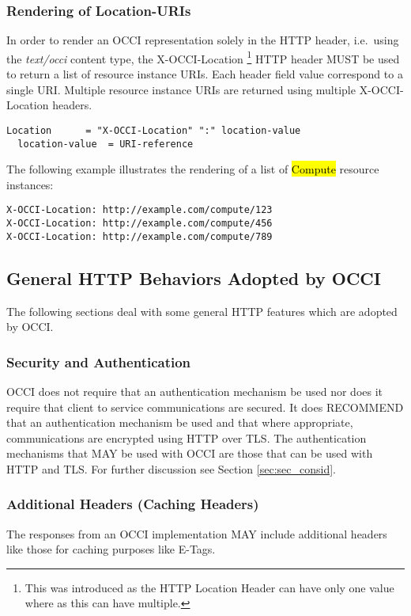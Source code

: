 \documentclass[10pt,a4paper]{article}
\begin{document}
\subsubsection{Rendering of Location-URIs}
In order to render an OCCI representation solely in the HTTP header,
i.e.~using the \textit{text/occi} content type, the X-OCCI-Location 
\footnote{This was introduced as the HTTP Location Header can have
  only one value where as this can have multiple.}  HTTP header MUST
be used to return a list of resource instance URIs. Each header field
value correspond to a single URI. Multiple resource instance URIs are
returned using multiple X-OCCI-Location headers.

\begin{verbatim}
Location      = "X-OCCI-Location" ":" location-value
  location-value  = URI-reference
\end{verbatim}

The following example illustrates the rendering of a list of
\hl{Compute} resource instances:
\begin{verbatim}
X-OCCI-Location: http://example.com/compute/123
X-OCCI-Location: http://example.com/compute/456
X-OCCI-Location: http://example.com/compute/789
\end{verbatim}

\subsection{General HTTP Behaviors Adopted by OCCI}
The following sections deal with some general HTTP features which are
adopted by OCCI.

\subsubsection{Security and Authentication}
OCCI does not require that an authentication mechanism be used nor
does it require that client to service communications are secured. It
does RECOMMEND that an authentication mechanism be used and that where
appropriate, communications are encrypted using HTTP over TLS. The
authentication mechanisms that MAY be used with OCCI are those that
can be used with HTTP and TLS. For further discussion see Section
\ref{sec:sec_consid}.

\subsubsection{Additional Headers (Caching Headers)}
The responses from an OCCI implementation MAY include additional
headers like those for caching purposes like E-Tags.
\end{document}
